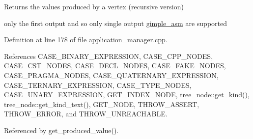 Returns the values produced by a vertex (recursive version) 

only the first output and so only single output \hyperlink{structgimple__asm}{gimple\+\_\+asm} are supported 

Definition at line 178 of file application\+\_\+manager.\+cpp.



References C\+A\+S\+E\+\_\+\+B\+I\+N\+A\+R\+Y\+\_\+\+E\+X\+P\+R\+E\+S\+S\+I\+ON, C\+A\+S\+E\+\_\+\+C\+P\+P\+\_\+\+N\+O\+D\+ES, C\+A\+S\+E\+\_\+\+C\+S\+T\+\_\+\+N\+O\+D\+ES, C\+A\+S\+E\+\_\+\+D\+E\+C\+L\+\_\+\+N\+O\+D\+ES, C\+A\+S\+E\+\_\+\+F\+A\+K\+E\+\_\+\+N\+O\+D\+ES, C\+A\+S\+E\+\_\+\+P\+R\+A\+G\+M\+A\+\_\+\+N\+O\+D\+ES, C\+A\+S\+E\+\_\+\+Q\+U\+A\+T\+E\+R\+N\+A\+R\+Y\+\_\+\+E\+X\+P\+R\+E\+S\+S\+I\+ON, C\+A\+S\+E\+\_\+\+T\+E\+R\+N\+A\+R\+Y\+\_\+\+E\+X\+P\+R\+E\+S\+S\+I\+ON, C\+A\+S\+E\+\_\+\+T\+Y\+P\+E\+\_\+\+N\+O\+D\+ES, C\+A\+S\+E\+\_\+\+U\+N\+A\+R\+Y\+\_\+\+E\+X\+P\+R\+E\+S\+S\+I\+ON, G\+E\+T\+\_\+\+I\+N\+D\+E\+X\+\_\+\+N\+O\+DE, tree\+\_\+node\+::get\+\_\+kind(), tree\+\_\+node\+::get\+\_\+kind\+\_\+text(), G\+E\+T\+\_\+\+N\+O\+DE, T\+H\+R\+O\+W\+\_\+\+A\+S\+S\+E\+RT, T\+H\+R\+O\+W\+\_\+\+E\+R\+R\+OR, and T\+H\+R\+O\+W\+\_\+\+U\+N\+R\+E\+A\+C\+H\+A\+B\+LE.



Referenced by get\+\_\+produced\+\_\+value().

